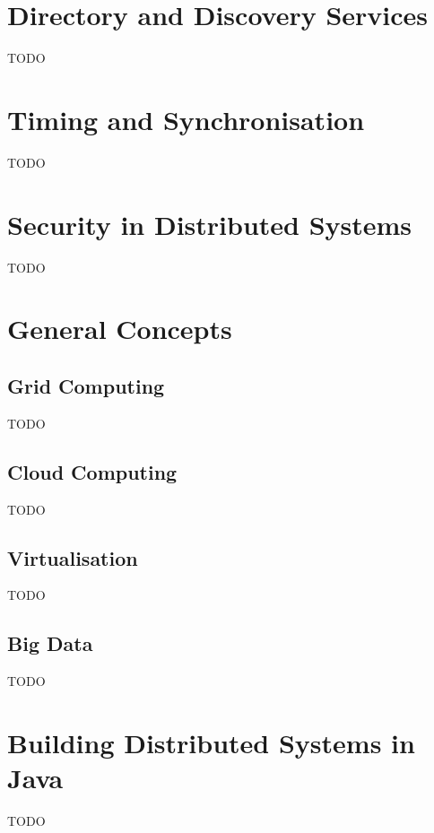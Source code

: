 \documentclass{article}
\begin{document}
\section{Directory and Discovery Services}

TODO

\section{Timing and Synchronisation}

TODO

\section{Security in Distributed Systems}

TODO

\section{General Concepts}

\subsection{Grid Computing}

TODO

\subsection{Cloud Computing}

TODO

\subsection{Virtualisation}

TODO

\subsection{Big Data}

TODO

\section{Building Distributed Systems in Java}

TODO



\end{document}

